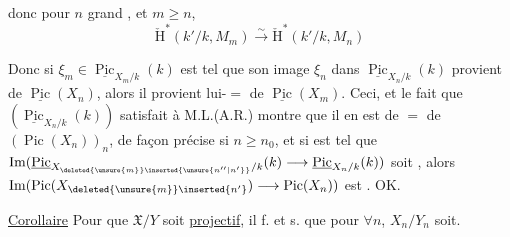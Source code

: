 
donc pour $n$ grand , et $m\geq n$,
\[
\check{\mathrm H}^{*}(k'/k,M_m)\xrightarrow{\sim}\check{\mathrm H}^{*}(k'/k,M_n)
\]


 Donc si $\xi_m\in\underline{\operatorname{Pic}}_{X_m/k}(k)$ est tel que son image $\xi_n$ dans $\underline{\operatorname{Pic}}_{X_n/k}(k)$ provient de $\underline{\operatorname{Pic}}(X_n)$, alors il provient lui-$=$ de $\underline{\operatorname{Pic}}(X_m)$. Ceci, et le fait que $(\underline{\operatorname{Pic}}_{X_n/k}(k))$ satisfait à M.L.(A.R.) montre que il en est de $=$ de $(\operatorname{Pic}(X_n))_n$, de façon précise si $n\geq n_0$,  et si  est tel que $\operatorname{Im}(\underline{\operatorname{Pic}}_{X_{\deleted{\unsure{m}}\inserted{\unsure{n''|n'}}}/k}(k)\longrightarrow\underline{\operatorname{Pic}}_{X_n/k}(k))$ soit , alors $\operatorname{Im}(\operatorname{Pic}(X_{\deleted{\unsure{m}}\inserted{n'}})\longrightarrow\operatorname{Pic}(X_n))$ est . OK.


\uline{Corollaire} Pour que $\mathfrak X/Y$ soit \uline{projectif}, il f. et s. que pour $\forall n$, $X_n/Y_n$  soit.

